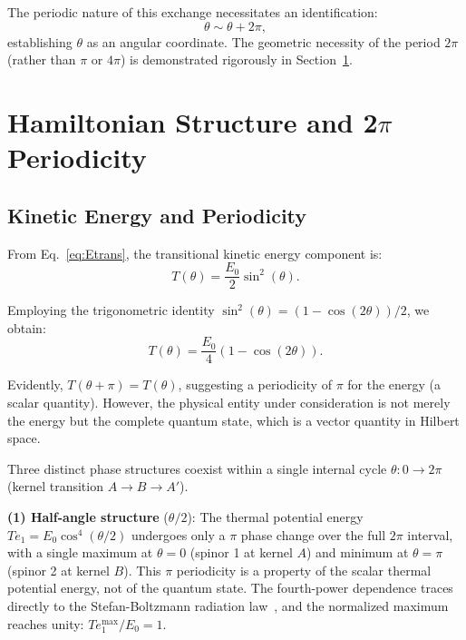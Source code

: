 \documentclass[%
 reprint,
 amsmath,amssymb,
 aps,
 prb,
]{revtex4-2}
\numberwithin{equation}{section}
\theoremstyle{definition}
\theoremstyle{remark}
\begin{document}
The periodic nature of this exchange necessitates an identification:
\begin{equation}
\theta \sim \theta + 2\pi,
\label{eq:periodicity}
\end{equation}
establishing $\theta$ as an angular coordinate. The geometric necessity of the period $2\pi$ (rather than $\pi$ or $4\pi$) is demonstrated rigorously in Section~\ref{sec:hamiltonian}.



\section{Hamiltonian Structure and 2$\pi$ Periodicity}
\label{sec:hamiltonian}

\subsection{Kinetic Energy and Periodicity}

From Eq.~\eqref{eq:Etrans}, the transitional kinetic energy component is:
\begin{equation}
T(\theta) = \frac{E_0}{2} \sin^2(\theta).
\label{eq:kinetic}
\end{equation}

Employing the trigonometric identity $\sin^2(\theta) = (1 - \cos(2\theta))/2$, we obtain:
\begin{equation}
T(\theta) = \frac{E_0}{4}(1 - \cos(2\theta)).
\label{eq:kinetic_explicit}
\end{equation}

Evidently, $T(\theta + \pi) = T(\theta)$, suggesting a periodicity of $\pi$ for the energy (a scalar quantity). However, the physical entity under consideration is not merely the energy but the complete quantum state, which is a vector quantity in Hilbert space.

Three distinct phase structures coexist within a single internal cycle $\theta: 0 \to 2\pi$ (kernel transition $A \to B \to A'$).

\textbf{(1) Half-angle structure} ($\theta/2$): The thermal potential energy $Te_1 = E_0\cos^4(\theta/2)$ undergoes only a $\pi$ phase change over the full $2\pi$ interval, with a single maximum at $\theta = 0$ (spinor 1 at kernel $A$) and minimum at $\theta = \pi$ (spinor 2 at kernel $B$). This $\pi$ periodicity is a property of the scalar thermal potential energy, not of the quantum state. The fourth-power dependence traces directly to the Stefan-Boltzmann radiation law~\cite{Hanamura_2018_01}, and the normalized maximum reaches unity: $Te_1^{\max}/E_0 = 1$.
\end{document}
